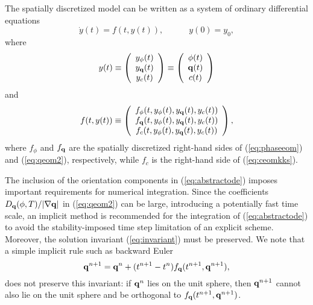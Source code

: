 The spatially discretized model can be written as a system of ordinary
differential equations
%
\begin{equation}
  \dot{y}(t) = f(t,y(t)), \hspace{3em} y(0) = y_0,
\label{eq:abstractode}
\end{equation}
%
where
%
\begin{equation}
  y(t) \equiv \left (
    \begin{array}{c}
      y_{\phi}(t) \\ y_{\bf q}(t) \\ y_c(t)
    \end{array}
  \right ) \equiv \left (
    \begin{array}{c}
      \phi(t) \\ {\bf q}(t) \\ c(t)
    \end{array}
  \right )
\end{equation}
%
and
%
\begin{equation}
  f(t,y(t)) \equiv \left (
    \begin{array}{c}
      f_{\phi}(t,y_{\phi}(t),y_{\bf q}(t),y_c(t)) \\
      f_{\bf q}(t,y_{\phi}(t),y_{\bf q}(t),y_c(t)) \\
      f_c(t,y_{\phi}(t),y_{\bf q}(t),y_c(t))
    \end{array}
  \right ),
\end{equation}
%
where $f_{\phi}$ and $f_{\bf q}$ are the spatially discretized
right-hand sides of (\ref{eq:phaseeom}) and (\ref{eq:qeom2}),
respectively, while $f_c$ is the right-hand side of
(\ref{eq:ceomkks}).

The inclusion of the orientation components in (\ref{eq:abstractode})
imposes important requirements for numerical integration.  Since the
coefficients $ D_{\bf q}(\phi,T) / |\nabla {\bf q} |$ in (\ref{eq:qeom2}) can be
large, introducing a potentially fast time scale, an implicit method
is recommended for the integration of (\ref{eq:abstractode}) to avoid the
stability-imposed time step limitation of an explicit scheme.
Moreover, the solution invariant (\ref{eq:invariant}) must be preserved.
We note that a simple implicit rule such as backward Euler
%
\begin{equation}
  {\bf q}^{n+1} = {\bf q}^n + (t^{n+1} - t^n) f_{\bf q}(t^{n+1},{\bf q}^{n+1}),
\end{equation}
%
does not preserve this invariant: if ${\bf q}^n$ lies on the unit
sphere, then ${\bf q}^{n+1}$ cannot also lie on the unit sphere and be
orthogonal to $f_{\bf q}(t^{n+1},{\bf q}^{n+1})$.

